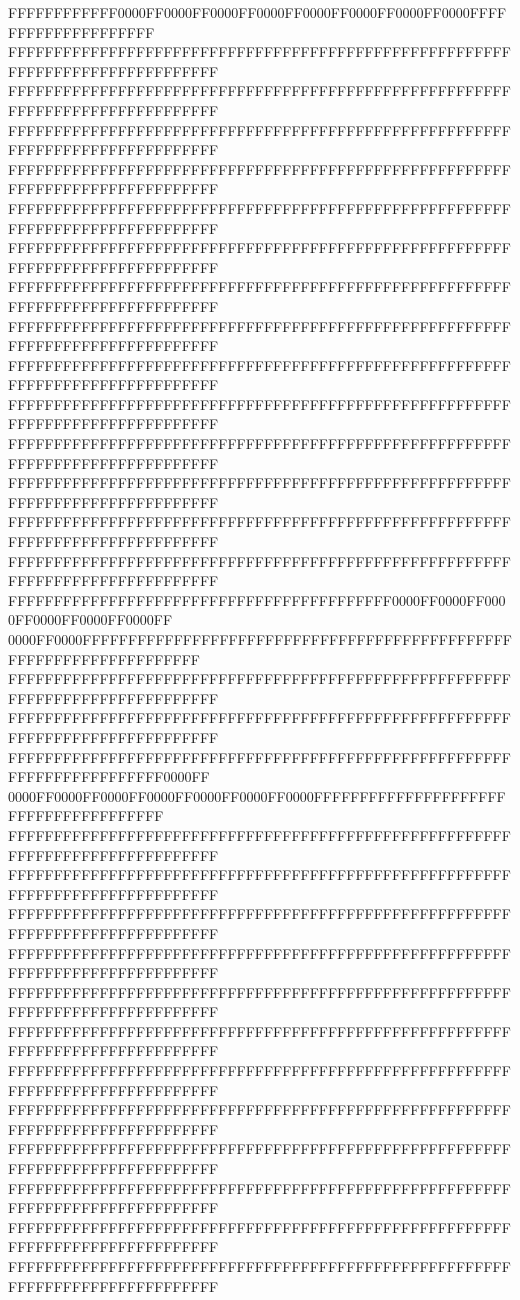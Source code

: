FFFFFFFFFFFF0000FF0000FF0000FF0000FF0000FF0000FF0000FF0000FFFFFFFFFFFFFFFFFFFF
FFFFFFFFFFFFFFFFFFFFFFFFFFFFFFFFFFFFFFFFFFFFFFFFFFFFFFFFFFFFFFFFFFFFFFFFFFFFFF
FFFFFFFFFFFFFFFFFFFFFFFFFFFFFFFFFFFFFFFFFFFFFFFFFFFFFFFFFFFFFFFFFFFFFFFFFFFFFF
FFFFFFFFFFFFFFFFFFFFFFFFFFFFFFFFFFFFFFFFFFFFFFFFFFFFFFFFFFFFFFFFFFFFFFFFFFFFFF
FFFFFFFFFFFFFFFFFFFFFFFFFFFFFFFFFFFFFFFFFFFFFFFFFFFFFFFFFFFFFFFFFFFFFFFFFFFFFF
FFFFFFFFFFFFFFFFFFFFFFFFFFFFFFFFFFFFFFFFFFFFFFFFFFFFFFFFFFFFFFFFFFFFFFFFFFFFFF
FFFFFFFFFFFFFFFFFFFFFFFFFFFFFFFFFFFFFFFFFFFFFFFFFFFFFFFFFFFFFFFFFFFFFFFFFFFFFF
FFFFFFFFFFFFFFFFFFFFFFFFFFFFFFFFFFFFFFFFFFFFFFFFFFFFFFFFFFFFFFFFFFFFFFFFFFFFFF
FFFFFFFFFFFFFFFFFFFFFFFFFFFFFFFFFFFFFFFFFFFFFFFFFFFFFFFFFFFFFFFFFFFFFFFFFFFFFF
FFFFFFFFFFFFFFFFFFFFFFFFFFFFFFFFFFFFFFFFFFFFFFFFFFFFFFFFFFFFFFFFFFFFFFFFFFFFFF
FFFFFFFFFFFFFFFFFFFFFFFFFFFFFFFFFFFFFFFFFFFFFFFFFFFFFFFFFFFFFFFFFFFFFFFFFFFFFF
FFFFFFFFFFFFFFFFFFFFFFFFFFFFFFFFFFFFFFFFFFFFFFFFFFFFFFFFFFFFFFFFFFFFFFFFFFFFFF
FFFFFFFFFFFFFFFFFFFFFFFFFFFFFFFFFFFFFFFFFFFFFFFFFFFFFFFFFFFFFFFFFFFFFFFFFFFFFF
FFFFFFFFFFFFFFFFFFFFFFFFFFFFFFFFFFFFFFFFFFFFFFFFFFFFFFFFFFFFFFFFFFFFFFFFFFFFFF
FFFFFFFFFFFFFFFFFFFFFFFFFFFFFFFFFFFFFFFFFFFFFFFFFFFFFFFFFFFFFFFFFFFFFFFFFFFFFF
FFFFFFFFFFFFFFFFFFFFFFFFFFFFFFFFFFFFFFFFFF0000FF0000FF0000FF0000FF0000FF0000FF
0000FF0000FFFFFFFFFFFFFFFFFFFFFFFFFFFFFFFFFFFFFFFFFFFFFFFFFFFFFFFFFFFFFFFFFFFF
FFFFFFFFFFFFFFFFFFFFFFFFFFFFFFFFFFFFFFFFFFFFFFFFFFFFFFFFFFFFFFFFFFFFFFFFFFFFFF
FFFFFFFFFFFFFFFFFFFFFFFFFFFFFFFFFFFFFFFFFFFFFFFFFFFFFFFFFFFFFFFFFFFFFFFFFFFFFF
FFFFFFFFFFFFFFFFFFFFFFFFFFFFFFFFFFFFFFFFFFFFFFFFFFFFFFFFFFFFFFFFFFFFFFFF0000FF
0000FF0000FF0000FF0000FF0000FF0000FF0000FFFFFFFFFFFFFFFFFFFFFFFFFFFFFFFFFFFFFF
FFFFFFFFFFFFFFFFFFFFFFFFFFFFFFFFFFFFFFFFFFFFFFFFFFFFFFFFFFFFFFFFFFFFFFFFFFFFFF
FFFFFFFFFFFFFFFFFFFFFFFFFFFFFFFFFFFFFFFFFFFFFFFFFFFFFFFFFFFFFFFFFFFFFFFFFFFFFF
FFFFFFFFFFFFFFFFFFFFFFFFFFFFFFFFFFFFFFFFFFFFFFFFFFFFFFFFFFFFFFFFFFFFFFFFFFFFFF
FFFFFFFFFFFFFFFFFFFFFFFFFFFFFFFFFFFFFFFFFFFFFFFFFFFFFFFFFFFFFFFFFFFFFFFFFFFFFF
FFFFFFFFFFFFFFFFFFFFFFFFFFFFFFFFFFFFFFFFFFFFFFFFFFFFFFFFFFFFFFFFFFFFFFFFFFFFFF
FFFFFFFFFFFFFFFFFFFFFFFFFFFFFFFFFFFFFFFFFFFFFFFFFFFFFFFFFFFFFFFFFFFFFFFFFFFFFF
FFFFFFFFFFFFFFFFFFFFFFFFFFFFFFFFFFFFFFFFFFFFFFFFFFFFFFFFFFFFFFFFFFFFFFFFFFFFFF
FFFFFFFFFFFFFFFFFFFFFFFFFFFFFFFFFFFFFFFFFFFFFFFFFFFFFFFFFFFFFFFFFFFFFFFFFFFFFF
FFFFFFFFFFFFFFFFFFFFFFFFFFFFFFFFFFFFFFFFFFFFFFFFFFFFFFFFFFFFFFFFFFFFFFFFFFFFFF
FFFFFFFFFFFFFFFFFFFFFFFFFFFFFFFFFFFFFFFFFFFFFFFFFFFFFFFFFFFFFFFFFFFFFFFFFFFFFF
FFFFFFFFFFFFFFFFFFFFFFFFFFFFFFFFFFFFFFFFFFFFFFFFFFFFFFFFFFFFFFFFFFFFFFFFFFFFFF
FFFFFFFFFFFFFFFFFFFFFFFFFFFFFFFFFFFFFFFFFFFFFFFFFFFFFFFFFFFFFFFFFFFFFFFFFFFFFF
